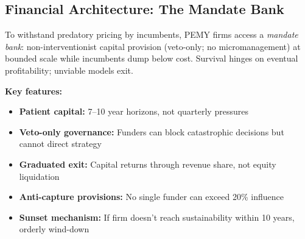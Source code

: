 \documentclass[11pt,a4paper]{article}
\theoremstyle{definition}
\theoremstyle{remark}
\begin{document}
\subsection{Financial Architecture: The Mandate Bank}
\label{subsec:pemy_bank}

To withstand predatory pricing by incumbents, PEMY firms access a \emph{mandate bank}: non-interventionist capital provision (veto-only; no micromanagement) at bounded scale while incumbents dump below cost. Survival hinges on eventual profitability; unviable models exit.

\textbf{Key features:}
\begin{itemize}[leftmargin=1.5em]
    \item \textbf{Patient capital:} 7--10 year horizons, not quarterly pressures
    \item \textbf{Veto-only governance:} Funders can block catastrophic decisions but cannot direct strategy
    \item \textbf{Graduated exit:} Capital returns through revenue share, not equity liquidation
    \item \textbf{Anti-capture provisions:} No single funder can exceed 20\% influence
    \item \textbf{Sunset mechanism:} If firm doesn't reach sustainability within 10 years, orderly wind-down
\end{itemize}
\end{document}
